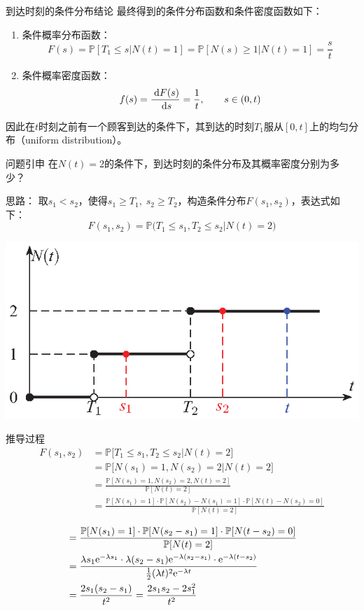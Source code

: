 \documentclass[t]{beamer}
\newcommand{\dif}{{\;\rm d}}
\renewcommand{\Pr}{\mathbb{P}}
\begin{document}
\begin{frame}{到达时刻的条件分布结论}
    最终得到的条件分布函数和条件密度函数如下：
\begin{enumerate}
\item 条件概率分布函数：
\[F(s)=\Pr[T_1\le s|N(t)=1]=\Pr[N(s)\ge 1|N(t)=1]=\frac{s}{t}\]
\item 	条件概率密度函数：
\[f(s)=\frac{\dif F(s)}{\dif s}=\frac{1}{t},\qquad s\in(0,t) \]
\end{enumerate}
因此在$t$时刻之前有一个顾客到达的条件下，其到达的时刻$T_1$服从$[0,t]$上的{均匀分布}（uniform distribution）。 
\end{frame}


\begin{frame}{问题引申}\small
    在$N(t)=2$的条件下，到达时刻的条件分布及其概率密度分别为多少？
\begin{block}{思路：}
     取$s_1<s_2$，使得$s_1\ge T_1,\; s_2\ge T_2$，构造条件分布$F(s_1,s_2)$，表达式如下：
\[F(s_1,s_2)=\Pr\big(T_1\le s_1,T_2\le s_2|N(t)=2\big)\]
\end{block}
   
\begin{center}
    \includegraphics{fig/poisson5.eps}
\end{center}
\end{frame}



\begin{frame}{推导过程}\small
    \[\begin{split}
        F(s_1,s_2)&=\Pr\big[T_1\le s_1,T_2\le s_2|N(t)=2\big]\\&=\Pr\big[N(s_1)=1,N(s_2)=2|N(t)=2\big]\\
        &=\frac{\Pr[N(s_1)=1,N(s_2)=2,N(t)=2]}{\Pr[N(t)=2]}\\
        &=\frac{\Pr[N(s_1)=1]\cdot \Pr[N(s_2)-N(s_1)=1]\cdot \Pr[N(t)-N(s_2)=0]}{\Pr[N(t)=2]}\\
        \end{split}\]
        \[\begin{split}
        &=\frac{\Pr[N(s_1)=1]\cdot \Pr[N(s_2-s_1)=1]\cdot \Pr[N(t-s_2)=0]}{\Pr[N(t)=2]}\\
        &=\frac{\lambda s_1{\rm e}^{-\lambda s_1}\cdot \lambda (s_2-s_1){\rm e}^{-\lambda (s_2-s_1)}\cdot {\rm e}^{-\lambda(t-s_2)}}{\frac{1}{2}(\lambda t)^2{\rm e}^{-\lambda t}}\\
        &=\frac{2s_1(s_2-s_1)}{t^2}=\frac{2s_1s_2-2s^2_1}{t^2}
        \end{split}\]
\end{frame}
\end{document}
